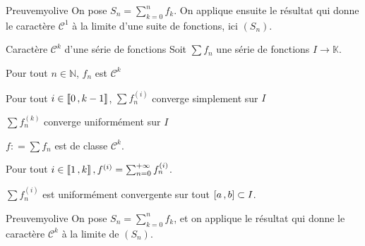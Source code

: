     \begin{demo}{Preuve}{myolive}
        On pose $S_n = \sum_{k=0}^{n} f_k$. On applique ensuite le résultat qui donne le caractère $\mathcal{C}^1$ à la limite d’une suite de fonctions, ici $(S_n)$.
    \end{demo}

    \begin{prop}{Caractère $\mathcal{C}^k$ d’une série de fonctions}
        Soit $\sum f_n$ une série de fonctions $I \to \mathbb{K}$.
        \begin{suppose}
            \item Pour tout $n \in \mathbb{N}$, $f_n$ est $\mathcal{C}^k$
            \item Pour tout $i \in \left\llbracket 0 \, , k-1 \right\rrbracket$, $\sum f_n^{(i)}$ converge simplement sur $I$
            \item $\sum f_n^{(k)}$ converge uniformément sur $I$
        \end{suppose}
        \begin{alors}
            \item $f : = \sum f_n$ est de classe $\mathcal{C}^k$.
            \item Pour tout $i \in \left\llbracket 1 \, , k \right\rrbracket, f^{(i)} = \sum_{n=0}^{+\infty} f_n^{(i)}$.
            \item $\sum f_n^{(i)}$ est uniformément convergente sur tout $\left[ a \, , b \right] \subset I$.
        \end{alors}
    \end{prop}

    \begin{demo}{Preuve}{myolive}
        On pose $S_n = \sum_{k=0}^{n} f_k$, et on applique le résultat qui donne le caractère $\mathcal{C}^k$ à la limite de $(S_n)$.
    \end{demo}

